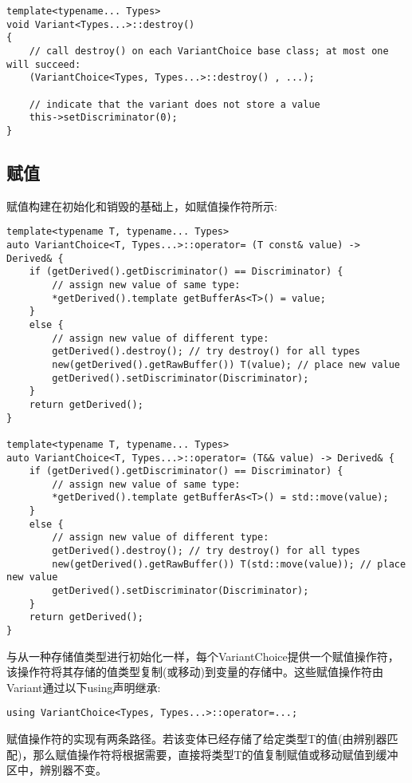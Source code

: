 \begin{lstlisting}[style=styleCXX]
template<typename... Types>
void Variant<Types...>::destroy()
{
	// call destroy() on each VariantChoice base class; at most one will succeed:
	(VariantChoice<Types, Types...>::destroy() , ...);
	
	// indicate that the variant does not store a value
	this->setDiscriminator(0);
}
\end{lstlisting}


\subsection{赋值}

赋值构建在初始化和销毁的基础上，如赋值操作符所示:

\begin{lstlisting}[style=styleCXX]
template<typename T, typename... Types>
auto VariantChoice<T, Types...>::operator= (T const& value) -> Derived& {
	if (getDerived().getDiscriminator() == Discriminator) {
		// assign new value of same type:
		*getDerived().template getBufferAs<T>() = value;
	}
	else {
		// assign new value of different type:
		getDerived().destroy(); // try destroy() for all types
		new(getDerived().getRawBuffer()) T(value); // place new value
		getDerived().setDiscriminator(Discriminator);
	}
	return getDerived();
}

template<typename T, typename... Types>
auto VariantChoice<T, Types...>::operator= (T&& value) -> Derived& {
	if (getDerived().getDiscriminator() == Discriminator) {
		// assign new value of same type:
		*getDerived().template getBufferAs<T>() = std::move(value);
	}
	else {
		// assign new value of different type:
		getDerived().destroy(); // try destroy() for all types
		new(getDerived().getRawBuffer()) T(std::move(value)); // place new value
		getDerived().setDiscriminator(Discriminator);
	}
	return getDerived();
}
\end{lstlisting}

与从一种存储值类型进行初始化一样，每个VariantChoice提供一个赋值操作符，该操作符将其存储的值类型复制(或移动)到变量的存储中。这些赋值操作符由Variant通过以下using声明继承:

\begin{lstlisting}[style=styleCXX]
using VariantChoice<Types, Types...>::operator=...;
\end{lstlisting}

赋值操作符的实现有两条路径。若该变体已经存储了给定类型T的值(由辨别器匹配)，那么赋值操作符将根据需要，直接将类型T的值复制赋值或移动赋值到缓冲区中，辨别器不变。

